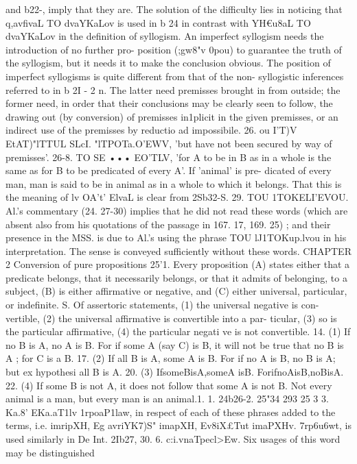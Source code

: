 and b22-{, imply that they are. The solution of the difficulty lies
in noticing that q,avfivaL TO dvaYKaLov is used in b 24 in contrast
with YH€u8aL TO dvaYKaLov in the definition of syllogism. An
imperfect syllogism needs the introduction of no further pro-
position (;gw8"v 0pou) to guarantee the truth of the syllogism,
but it needs it to make the conclusion obvious. The position of
imperfect syllogisms is quite different from that of the non-
syllogistic inferences referred to in b 2I - 2 n. The latter need
premisses brought in from outside; the former need, in order that
their conclusions may be clearly seen to follow, the drawing out
(by conversion) of premisses in1plicit in the given premisses, or
an indirect use of the premisses by reductio ad impossibile.
26. ou I'T)V EtAT)"lTTUL SLcI. "lTPOTa.O'EWV, 'but have not been secured
by way of premisses'.
26-8. TO SE ••• EO'TLV, 'for A to be in B as in a whole is the
same as for B to be predicated of every A'. If 'animal' is pre-
dicated of every man, man is said to be in animal as in a whole
to which it belongs. That this is the meaning of lv OA't' ElvaL is
clear from 2Sb32-S.
29. TOU \I1TOKELI'EVOU. Al.'s commentary (24. 27-30) implies
that he did not read these words (which are absent also from his
quotations of the passage in 167. 17, 169. 25) ; and their presence
in the MSS. is due to Al.'s using the phrase TOU lJ1TOKup.lvou in his
interpretation. The sense is conveyed sufficiently without these
words.
CHAPTER 2
Conversion of pure propositions
25'1. Every proposition (A) states either that a predicate
belongs, that it necessarily belongs, or that it admits of belonging,
to a subject, (B) is either affirmative or negative, and (C) either
universal, particular, or indefinite.
S. Of assertoric statements, (1) the universal negative is con-
vertible, (2) the universal affirmative is convertible into a par-
ticular, (3) so is the particular affirmative, (4) the particular
negati ve is not convertible.
14. (1) If no B is A, no A is B. For if some A (say C) is B, it
will not be true that no B is A ; for C is a B.
17. (2) If all B is A, some A is B. For if no A is B, no B is A;
but ex hypothesi all B is A.
20. (3) IfsomeBisA,someA isB. ForifnoAisB,noBisA.
22. (4) If some B is not A, it does not follow that some A is
not B. Not every animal is a man, but every man is an animal.1. 1. 24b26-2. 25"34
293
25 3 3. Ka.8' EKa.aT1lv 1rpoaP1law, in respect of each of these
phrases added to the terms, i.e. imripXH, Eg avriYK7)S" imapXH,
Ev8iX£Tut imaPXHv. 7rp6u6wt, is used similarly in De Int. 2Ib27, 30.
6. c:i.vnaTpecl>Ew. Six usages of this word may be distinguished
}
